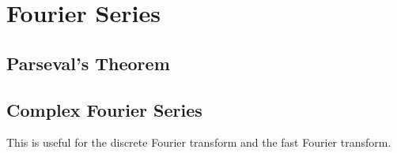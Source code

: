 \section{Fourier Series}
\subsection*{Parseval's Theorem}
\subsection*{Complex Fourier Series}
This is useful for the discrete Fourier transform and the fast Fourier transform.